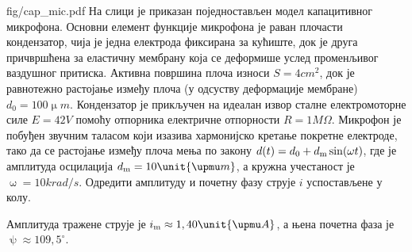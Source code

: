 \begin{slikaDesno}{fig/cap_mic.pdf}
\PID
На слици је приказан поједностављен модел капацитивног микрофона. Основни елемент функције микрофона је раван плочасти кондензатор, чија је једна електрода фиксирана за кућиште, док је друга причвршћена за еластичну мембрану која се деформише услед променљивог ваздушног притиска. Активна површина плоча износи $S = 4\unit{cm^2}$, док је равнотежно растојање између плоча (у одсуству деформације мембране) $d_0 = 100\unit{\upmu m}$.
Кондензатор је прикључен на идеалан извор сталне електромоторне силе $E = 42\unit{V}$ 
помоћу отпорника електричне отпорности $R = 1\unit{M\Omega}$. 
Микрофон је побуђен звучним таласом који изазива хармонијско кретање покретне електроде, тако да се растојање између плоча мења по закону $d(t) = d_0 + d_{\rm m}\sin(\omega t)$, где је амплитуда осцилација $d_{\rm m} = 10\unit{\upmu m}$, 
а кружна учестаност је 
$\upomega =10\unit{krad/s}$. Одредити амплитуду и почетну фазу струје $i$ успостављене у колу.
\end{slikaDesno}
\REZULTAT

Амплитуда тражене струје је $i_{\rm m} \approx 1,40\unit{\upmu A}$, а њена почетна фаза је 
$\uppsi
 \approx 109,5^\circ$.
